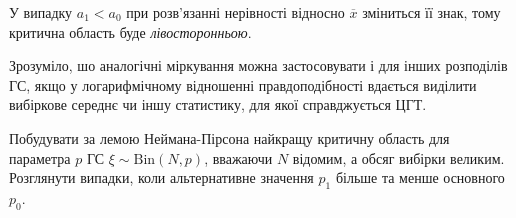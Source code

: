 У випадку $a_1 < a_0$ при розв'язанні нерівності відносно $\overline{x}$ зміниться її знак, тому критична область буде \emph{лівосторонньою}.

Зрозуміло, шо аналогічні міркування можна застосовувати і для інших розподілів ГС, якщо у логарифмічному відношенні правдоподібності вдається
виділити вибіркове середнє чи іншу статистику, для якої справджується ЦГТ.

\begin{exercise}
    Побудувати за лемою Неймана-Пірсона найкращу критичну область для параметра $p$ ГС $\xi \sim \mathrm{Bin}(N, p)$, вважаючи $N$ відомим, а обсяг вибірки великим.
    Розглянути випадки, коли альтернативне значення $p_1$ більше та менше основного $p_0$.
\end{exercise}